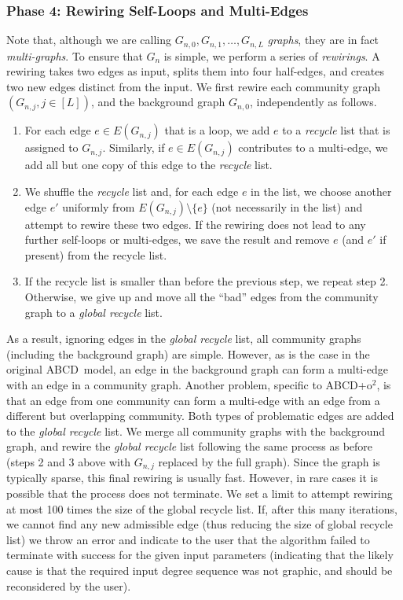 \documentclass[review,los,12pt]{ryethesis}
\newcommand{\abcd}{{ABCD}}
\newcommand{\abcdoo}{{ABCD+o$^2$}}
\begin{document}
\subsubsection*{Phase 4: Rewiring Self-Loops and Multi-Edges}
Note that, although we are calling $G_{n,0},G_{n,1},\dots,G_{n,L}$ \textit{graphs}, they are in fact \textit{multi-graphs}.
To ensure that $G_n$ is simple, we perform a series of \textit{rewirings}.
A rewiring takes two edges as input, splits them into four half-edges, and creates two new edges distinct from the input.
We first rewire each community graph $(G_{n,j}, j \in [L])$, and the background graph $G_{n, 0}$, independently as follows.
\begin{enumerate}
\item For each edge $e \in E(G_{n,j})$ that is a loop, we add $e$ to a \textit{recycle} list that is assigned to $G_{n,j}$. Similarly, if $e\in E(G_{n,j})$ contributes to a multi-edge, we add all but one copy of this edge to the \textit{recycle} list.
\item We shuffle the \textit{recycle} list and, for each edge $e$ in the list, we choose another edge $e'$ uniformly from $E(G_{n,j}) \setminus \{e\}$ (not necessarily in the list) and attempt to rewire these two edges. If the rewiring does not lead to any further self-loops or multi-edges, we save the result and remove $e$ (and $e'$ if present) from the recycle list.
\item If the recycle list is smaller than before the previous step, we repeat step 2. Otherwise, we give up and move all the ``bad'' edges from the community graph to a \textit{global recycle} list.
\end{enumerate}

As a result, ignoring edges in the \textit{global recycle} list, all community graphs (including the background graph) are simple.
However, as is the case in the original \abcd\ model, an edge in the background graph can form a multi-edge with an edge in a community graph.
Another problem, specific to \abcdoo, is that an edge from one community can form a multi-edge with an edge from a different but overlapping community.
Both types of problematic edges are added to the \emph{global recycle} list.
We merge all community graphs with the background graph, and rewire the \textit{global recycle} list following the same process as before (steps 2 and 3 above with $G_{n,j}$ replaced by the full graph).
Since the graph is typically sparse, this final rewiring is usually fast.
However, in rare cases it is possible that the process does not terminate.
We set a limit to attempt rewiring at most 100 times the size of the global recycle list.
If, after this many iterations, we cannot find any new admissible edge (thus reducing the size of global recycle list) we throw an error and indicate to the user that the algorithm failed to terminate with success for the given input parameters (indicating that the likely cause is that the required input degree sequence was not graphic, and should be reconsidered by the user).
\end{document}
